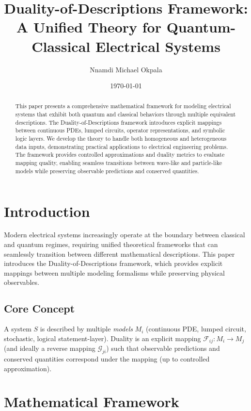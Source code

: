 \documentclass[11pt,a4paper]{article}
\author{Nnamdi Michael Okpala}
\date{\today}
\title{Duality-of-Descriptions Framework:\\
A Unified Theory for Quantum-Classical Electrical Systems}
\begin{document}
\maketitle

\begin{abstract}
This paper presents a comprehensive mathematical framework for modeling electrical systems that exhibit both quantum and classical behaviors through multiple equivalent descriptions. The Duality-of-Descriptions framework introduces explicit mappings between continuous PDEs, lumped circuits, operator representations, and symbolic logic layers. We develop the theory to handle both homogeneous and heterogeneous data inputs, demonstrating practical applications to electrical engineering problems. The framework provides controlled approximations and duality metrics to evaluate mapping quality, enabling seamless transitions between wave-like and particle-like models while preserving observable predictions and conserved quantities.
\end{abstract}

\tableofcontents
\newpage

\section{Introduction}
\label{sec:intro}

Modern electrical systems increasingly operate at the boundary between classical and quantum regimes, requiring unified theoretical frameworks that can seamlessly transition between different mathematical descriptions. This paper introduces the Duality-of-Descriptions framework, which provides explicit mappings between multiple modeling formalisms while preserving physical observables.

\subsection{Core Concept}
A system $S$ is described by multiple \textit{models} $M_i$ (continuous PDE, lumped circuit, stochastic, logical statement-layer). Duality is an explicit mapping $\mathcal{F}_{ij}: M_i \to M_j$ (and ideally a reverse mapping $\mathcal{G}_{ji}$) such that observable predictions and conserved quantities correspond under the mapping (up to controlled approximation).

\section{Mathematical Framework}
\label{sec:math_framework}
\end{document}
